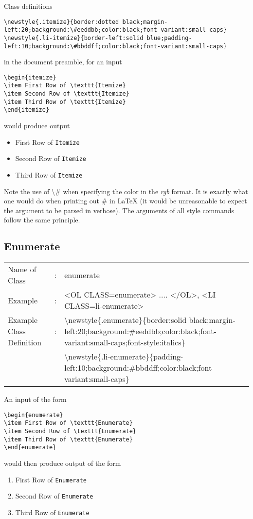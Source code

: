 \documentclass {article}
\begin{document}
Class definitions 
\begin{verbatim}
\newstyle{.itemize}{border:dotted black;margin-left:20;background:\#eeddbb;color:black;font-variant:small-caps}
\newstyle{.li-itemize}{border-left:solid blue;padding-left:10;background:\#bbddff;color:black;font-variant:small-caps}
\end{verbatim}
in the document preamble, for an input 
\begin{verbatim}
\begin{itemize}
\item First Row of \texttt{Itemize}
\item Second Row of \texttt{Itemize}
\item Third Row of \texttt{Itemize}
\end{itemize}
\end{verbatim}
would produce output 
\begin{itemize}
\item First Row of \texttt{Itemize}
\item Second Row of \texttt{Itemize}
\item Third Row of \texttt{Itemize}
\end{itemize}
Note the use of $\setminus$\# when specifying the color in the \emph{rgb} format. It is exactly what one would do when printing out \# in \LaTeX{} (it would be unreasonable to expect the argument to be parsed in verbose). The arguments of all style commands follow the same principle.
\subsection{Enumerate}
\begin{tabular}{lll}
Name of Class & : & enumerate\\
Example & : & <OL CLASS=enumerate> .... </OL>, <LI CLASS=li-enumerate>\\
Example Class Definition & : & $\setminus$newstyle\{.enumerate\}\{border:solid black;margin-left:20;background:\#eeddbb;color:black;font-variant:small-caps;font-style:italics\}\\
 & & $\setminus$newstyle\{.li-enumerate\}\{padding-left:10;background:\#bbddff;color:black;font-variant:small-caps\}\\
\end{tabular}

An input of the form
\begin{verbatim}
\begin{enumerate}
\item First Row of \texttt{Enumerate}
\item Second Row of \texttt{Enumerate}
\item Third Row of \texttt{Enumerate}
\end{enumerate}
\end{verbatim}
would then produce output of the form\begin{enumerate}
\item First Row of \texttt{Enumerate}
\item Second Row of \texttt{Enumerate}
\item Third Row of \texttt{Enumerate}
\end{enumerate}
\end{document}
